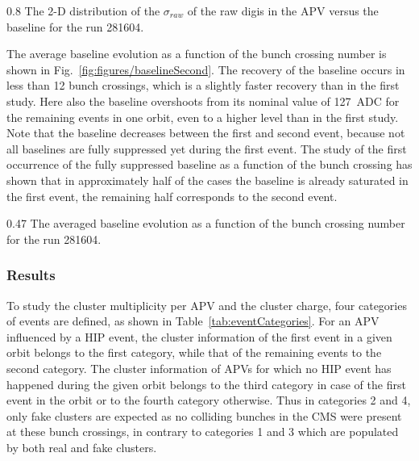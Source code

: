                  {0.8}       %
                 {The 2-D distribution of the $\sigma_{raw}$ of the raw digis in the APV versus the baseline for the run 281604.  } %


The average baseline evolution as a function of the bunch crossing number is shown in Fig.~\ref{fig:figures/baselineSecond}. The recovery of the baseline occurs in less than 12 bunch crossings, which is a slightly faster recovery than in the first study. Here also the baseline overshoots from its nominal value of 127~ADC for the remaining events in one orbit, even to a higher level than in the first study. Note that the baseline decreases between the first and second event, because not all baselines are fully suppressed yet during the first event. The study of the first occurrence of the fully suppressed baseline as a function of the bunch crossing has shown that in approximately half of the cases the baseline is already saturated in the first event, the remaining half corresponds to the second event.

                 {0.47}       %
                 {The averaged baseline evolution as a function of the bunch crossing number for the run 281604. } %
 

\subsubsection{Results}

To study the cluster multiplicity per APV and the cluster charge, four categories of events are defined, as shown in Table~\ref{tab:eventCategories}. For an APV influenced by a HIP event, the cluster information of the first event in a given orbit belongs to the first category, while that of the remaining events to the second category. The cluster information of APVs for which no HIP event has happened during the given orbit belongs to the third category in case of the first event in the orbit or to the fourth category otherwise. Thus in categories 2 and 4, only fake clusters are expected as no colliding bunches in the CMS were present at these bunch crossings, in contrary to categories 1 and 3 which are populated by both real and fake clusters.


